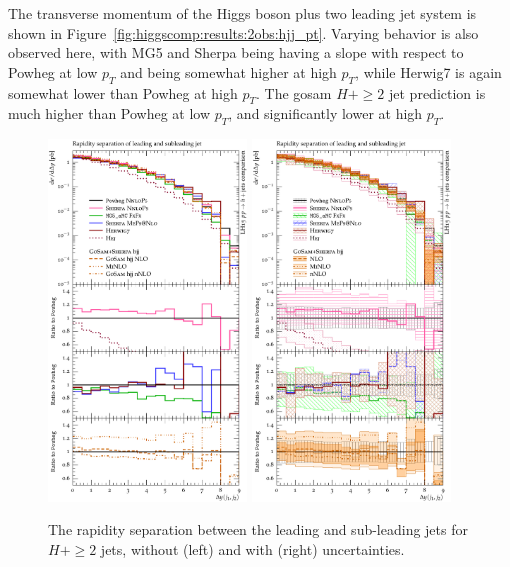 The transverse momentum of the Higgs boson plus two leading jet system
is shown in Figure~\ref{fig:higgscomp:results:2obs:hjj_pt}. Varying
behavior is also observed here, with MG5 and Sherpa being having a
slope with respect to Powheg at low $p_T$ and being somewhat higher at
high $p_T$, while Herwig7 is again somewhat lower than Powheg at high
$p_T$. The gosam $H+\ge2$ jet prediction is much higher than Powheg at
low $p_T$, and significantly lower at high $p_T$.


\begin{figure}[t!]
  \centering
  \includegraphics[width=0.47\textwidth]{figures/hjetscomp_u_deltay_jj.pdf}
  \hfill
  \includegraphics[width=0.47\textwidth]{figures/hjetscomp_deltay_jj.pdf}
  \caption{
    The rapidity separation between the leading and sub-leading jets
    for $H+\ge2$ jets, without (left) and with (right) uncertainties.
    \label{fig:higgscomp:results:2obs:dyjj}
  }
\end{figure}

